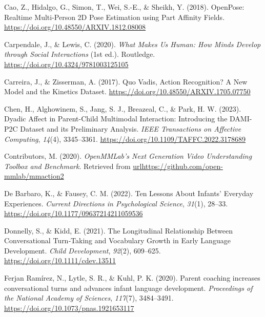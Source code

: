 \documentclass[
  man,floatsintext]{apa6}
\newlength{\cslhangindent}
\newenvironment{CSLReferences}[2] %
 {\begin{list}{}{%
  \setlength{\itemindent}{0pt}
  \setlength{\leftmargin}{0pt}
  \setlength{\parsep}{0pt}
  \ifodd #1
   \setlength{\leftmargin}{\cslhangindent}
   \setlength{\itemindent}{-1\cslhangindent}
  \fi
  \setlength{\itemsep}{#2\baselineskip}}}
 {\end{list}}
\begin{document}
\begin{CSLReferences}{1}{0}
Cao, Z., Hidalgo, G., Simon, T., Wei, S.-E., \& Sheikh, Y. (2018). {OpenPose}: {Realtime Multi-Person 2D Pose Estimation} using {Part Affinity Fields}. \url{https://doi.org/10.48550/ARXIV.1812.08008}

Carpendale, J., \& Lewis, C. (2020). \emph{What {Makes Us Human}: {How Minds Develop} through {Social Interactions}} (1st ed.). Routledge. \url{https://doi.org/10.4324/9781003125105}

Carreira, J., \& Zisserman, A. (2017). Quo {Vadis}, {Action Recognition}? {A New Model} and the {Kinetics Dataset}. \url{https://doi.org/10.48550/ARXIV.1705.07750}

Chen, H., Alghowinem, S., Jang, S. J., Breazeal, C., \& Park, H. W. (2023). Dyadic {Affect} in {Parent-Child Multimodal Interaction}: {Introducing} the {DAMI-P2C Dataset} and its {Preliminary Analysis}. \emph{IEEE Transactions on Affective Computing}, \emph{14}(4), 3345--3361. \url{https://doi.org/10.1109/TAFFC.2022.3178689}

Contributors, M. (2020). \emph{{OpenMMLab}'s {Next Generation Video Understanding Toolbox} and {Benchmark}}. Retrieved from \url{urlhttps://github.com/open-mmlab/mmaction2}

De Barbaro, K., \& Fausey, C. M. (2022). Ten {Lessons About Infants}' {Everyday Experiences}. \emph{Current Directions in Psychological Science}, \emph{31}(1), 28--33. \url{https://doi.org/10.1177/09637214211059536}

Donnelly, S., \& Kidd, E. (2021). The {Longitudinal Relationship Between Conversational Turn}‐{Taking} and {Vocabulary Growth} in {Early Language Development}. \emph{Child Development}, \emph{92}(2), 609--625. \url{https://doi.org/10.1111/cdev.13511}

Ferjan Ramírez, N., Lytle, S. R., \& Kuhl, P. K. (2020). Parent coaching increases conversational turns and advances infant language development. \emph{Proceedings of the National Academy of Sciences}, \emph{117}(7), 3484--3491. \url{https://doi.org/10.1073/pnas.1921653117}


\end{CSLReferences}
\end{document}
